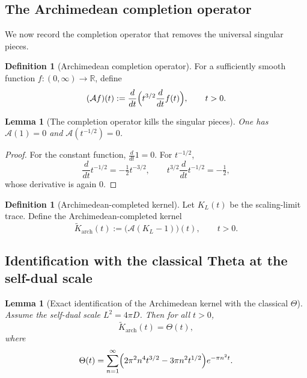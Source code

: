 \documentclass[12pt]{amsart}
\newtheorem{lemma}[theorem]{Lemma}
\theoremstyle{definition}
\newtheorem{definition}[theorem]{Definition}
\theoremstyle{remark}
\newcommand{\R}{\mathbb{R}}
\begin{document}
\subsection{The Archimedean completion operator}

We now record the completion operator that removes the universal singular pieces.

\begin{definition}[Archimedean completion operator]
\label{def:arch-operator}
For a sufficiently smooth function $f:(0,\infty)\to\R$, define
\begin{equation}\label{eq:arch-operator}
(\mathcal A f)(t):=\frac{d}{dt}\Bigl(t^{3/2}\frac{d}{dt}f(t)\Bigr),\qquad t>0.
\end{equation}
\end{definition}

\begin{lemma}[The completion operator kills the singular pieces]
\label{lem:A-kills-singular}
One has \(\mathcal A(1)=0\) and \(\mathcal A(t^{-1/2})=0\).
\end{lemma}

\begin{proof}
For the constant function, \(\frac{d}{dt}1=0\). For \(t^{-1/2}\),
\[
\frac{d}{dt}t^{-1/2}=-\tfrac12 t^{-3/2},\qquad
t^{3/2}\frac{d}{dt}t^{-1/2}=-\tfrac12,
\]
whose derivative is again \(0\).
\end{proof}

\begin{definition}[Archimedean-completed kernel]
\label{def:arch-theta-kernel}
Let $K_L(t)$ be the scaling-limit trace. Define the Archimedean-completed kernel
\[
\widetilde K_{\mathrm{arch}}(t) :=\bigl(\mathcal{A}(K_L-1)\bigr)(t),\qquad t>0.
\]
\end{definition}

\subsection{Identification with the classical Theta at the self-dual scale}

\begin{lemma}[Exact identification of the Archimedean kernel with the classical $\Theta$]
\label{lem:arch-equals-Theta}
Assume the self-dual scale $L^2=4\pi D$. Then for all $t>0$,
\[
\widetilde K_{\mathrm{arch}}(t)=\Theta(t),
\]
where
\[
\Theta(t)=\sum_{n=1}^{\infty}\Bigl(2\pi^2 n^4 t^{3/2}-3\pi n^2 t^{1/2}\Bigr)e^{-\pi n^2 t}.
\]
\end{lemma}
\end{document}
